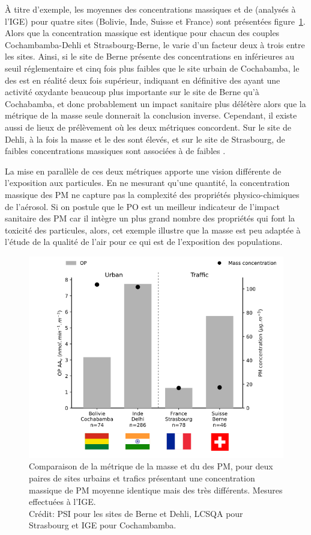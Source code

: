 À titre d'exemple, les moyennes des concentrations massiques et de \POAAv{} (analysés à
l'IGE) pour quatre sites (Bolivie,
Inde, Suisse et France) sont présentées figure~\ref{fig:OPAAv_4sites}.
Alors que la concentration massique est identique pour chacun des couples
Cochambamba-Dehli et Strasbourg-Berne, le \POAAv{} varie d'un facteur deux à trois entre les
sites.  Ainsi, si
le site de Berne présente des concentrations en \PMdix{} inférieures au seuil réglementaire
et cinq fois plus faibles que le site urbain de Cochabamba, le \POAAv{} des \PMdix{} est
en réalité deux fois supérieur, indiquant en définitive des \PMdix{} ayant une activité
oxydante beaucoup plus importante sur le site de Berne qu'à Cochabamba, et donc
probablement un impact sanitaire plus délétère alors que la métrique de la masse seule
donnerait la conclusion inverse.
Cependant, il existe aussi de lieux de prélèvement où les deux métriques concordent. Sur le
site de Dehli, à la fois la masse et le \POAAv{} des \PMdix{} sont élevés, et sur le
site de Strasbourg, de faibles concentrations massiques sont associées à de faibles \POAAv.

La mise en parallèle de ces deux métriques apporte une vision différente de l'exposition
aux particules.
En ne mesurant qu'une quantité, la concentration massique des PM ne capture pas la complexité
des propriétés physico-chimiques de l'aérosol. Si on postule que le PO est
un meilleur indicateur de l'impact sanitaire des PM car il intègre un plus grand 
nombre des propriétés qui font la toxicité des particules, alors, cet exemple illustre
que la masse est peu adaptée à l'étude de la qualité de l'air pour ce qui est de l'exposition 
des populations.


\begin{figure}[ht!]
    \centering
    \includegraphics[width=0.7\linewidth]{figures/chapter04/OPAAv_4sites.png}
    \caption[Comparaison de la métrique de la masse et du \POAAv{} des PM, pour deux paires
        de sites urbains et trafics présentant une concentration massique de PM
        moyenne identique mais des \POAAv{} très différents]{Comparaison de la métrique de la masse et du \POAAv{} des PM, pour deux paires
        de sites urbains et trafics présentant une concentration massique de PM
        moyenne identique mais des \POAAv{} très différents. Mesures effectuées à l'IGE.\\
        Crédit: PSI pour les sites de Berne et Dehli, LCSQA pour Strasbourg et IGE pour
        Cochambamba.
    }%
    \label{fig:OPAAv_4sites}
\end{figure}



